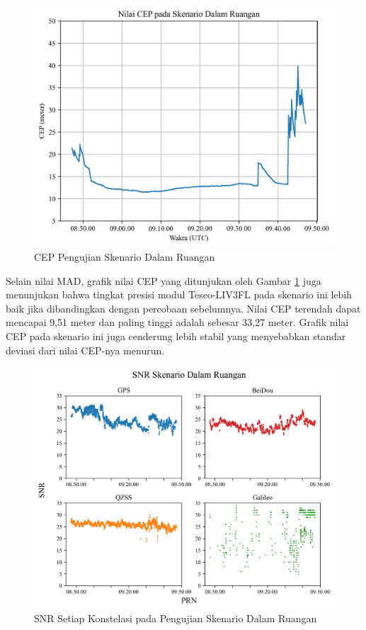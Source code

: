 \begin{figure}[H]
	\centering
	\includegraphics[width=13cm]{contents/chapter-4/2-skenario-indoor/cep.png}
	\caption{CEP Pengujian Skenario Dalam Ruangan}
	\label{Fig: indoor-cep}
\end{figure}

Selain nilai MAD, grafik nilai CEP yang ditunjukan oleh Gambar \ref{Fig: indoor-cep} juga menunjukan bahwa tingkat presisi modul Teseo-LIV3FL pada skenario ini lebih baik jika dibandingkan dengan percobaan sebelumnya. Nilai CEP terendah dapat mencapai 9,51 meter dan paling tinggi adalah sebesar 33,27 meter. Grafik nilai CEP pada skenario ini juga cenderung lebih stabil yang menyebabkan standar deviasi dari nilai CEP-nya menurun. 

\begin{figure}[H]
	\centering
	\includegraphics[width=13cm]{contents/chapter-4/2-skenario-indoor/snr.png}
	\caption{SNR Setiap Konstelasi pada Pengujian Skenario Dalam Ruangan}
	\label{Fig: indoor-snr}
\end{figure}

